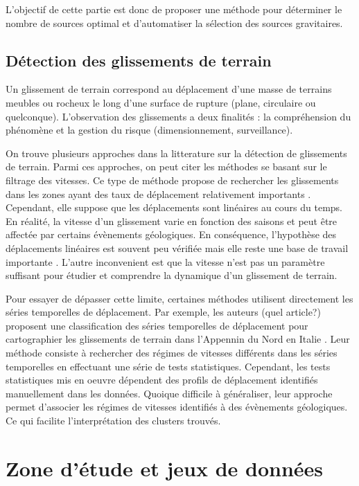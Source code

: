 \documentclass[11pt, openany]{report}
\begin{document}
L'objectif de cette partie est donc de proposer une méthode pour déterminer le nombre de sources optimal et d'automatiser la sélection des sources gravitaires. 

\section{Détection des glissements de terrain}
Un glissement de terrain correspond au  déplacement d’une masse de terrains meubles ou rocheux le long d’une surface de rupture  (plane,   circulaire   ou quelconque). L'observation des glissements a deux finalités : la compréhension du phénomène et la gestion du risque (dimensionnement, surveillance).

On trouve plusieurs approches dans la litterature sur la détection de glissements de terrain. Parmi ces approches, on peut citer les méthodes se basant sur le filtrage des vitesses. Ce type de méthode propose de rechercher les glissements dans les zones ayant des taux de déplacement relativement importants \cite{RMS}. Cependant, elle suppose que les déplacements sont linéaires au cours du temps. En réalité, la vitesse d'un glissement varie en fonction des saisons et peut être affectée par certains évènements géologiques. En conséquence, l'hypothèse des déplacements linéaires est souvent peu vérifiée mais elle reste une base de travail importante \cite{INTFC}. L'autre inconvenient est que la vitesse n'est pas un paramètre suffisant pour étudier et comprendre la dynamique d'un glissement de terrain.

Pour essayer de dépasser cette limite, certaines méthodes utilisent directement les séries temporelles de déplacement. Par exemple, les auteurs (quel article?) proposent une classification des séries temporelles de déplacement pour cartographier les glissements de terrain dans l'Appennin du Nord en Italie \cite{INTFC}. Leur méthode consiste à rechercher des régimes de vitesses différents dans les séries temporelles en effectuant une série de tests statistiques. Cependant, les tests statistiques mis en oeuvre dépendent des profils de déplacement identifiés manuellement dans les données. Quoique difficile à généraliser, leur approche permet d'associer les régimes de vitesses identifiés à des évènements géologiques. Ce qui facilite l'interprétation des clusters trouvés.


\chapter{Zone d'étude et jeux de données}
\end{document}
